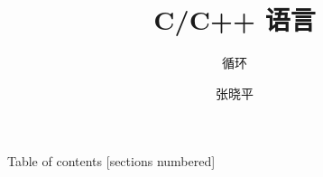 \documentclass[10pt]{beamer}
\title{C/C++ 语言}
\subtitle{循环}
\date{}%
\author{张晓平}
\institute{武汉大学数学与统计学院}
\newcommand\Fontvi{\fontsize{6.5}{7.2}\selectfont}
\begin{document}
\maketitle

\begin{frame}{Table of contents}
  [sections numbered]
  \begin{multicols}{2}
    \tableofcontents[hideallsubsections]
  \end{multicols}
\end{frame}















\end{document}

